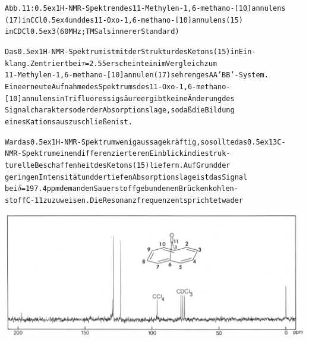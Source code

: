\documentclass[a4paper,11pt]{article}
\begin{document}
\begin{alltt}
Abb. 11: \raise0.5ex\hbox{1}H-NMR-Spektren des 11-Methylen-1,6-methano-[10]annulens
(17) in CCl\lower0.5ex\hbox{4} und des 11-0xo-1,6-methano-[10]annulens (15)
in CDCl\lower0.5ex\hbox{3} (60 MHz; TMS als innerer Standard)

 

Das \raise0.5ex\hbox{1}H-NMR-Spektrum ist mit der Struktur des Ketons (15) in Ein-
klang. Zentriert bei \(\tau\) = 2.55 erscheint ein im Vergleich zum
11-Methylen-1,6-methano-[10]annulen (17) sehr enges AA'BB'-System.
Eine erneute Aufnahme des Spektrums des 11-Oxo-1,6-methano-
[10]annulens in Trifluoressigsäure ergibt keine Änderung des
Signalcharakters oder der Absorptionslage, so daß die Bildung
eines Kations auszuschließen ist.

\newpage
{}


War das \raise0.5ex\hbox{1}H-NMR-Spektrum wenig aussagekräftig, so sollte das \raise0.5ex\hbox{13}C-
NMR-Spektrum einen differenzierteren Einblick in die struk-
turelle Beschaffenheit des Ketons (15) liefern. Auf Grund der
geringen Intensität und der tiefen Absorptionslage ist das Signal
bei \(\delta\) = 197.4 ppm dem an den Sauerstoff gebundenen Brückenkohlen-
stoff C-11 zuzuweisen. Die Resonanzfrequenz entspricht etwa der

\end{alltt}
\hspace*{-0.25cm}\includegraphics[width=14.7cm]{NMR_012}
\end{document}
